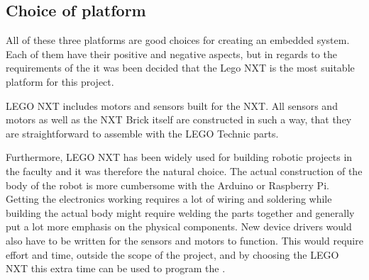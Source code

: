 \subsection{Choice of platform}
All of these three platforms are good choices for creating an embedded system. Each of them have their positive and negative aspects, but in regards to the requirements of the \projname{} it was been decided that the Lego NXT is the most suitable platform for this project.

LEGO NXT includes motors and sensors built for the NXT. All sensors and motors as well as the NXT Brick itself are constructed in such a way, that they are straightforward to assemble with the LEGO Technic parts. 

Furthermore, LEGO NXT has been widely used for building robotic projects in the faculty and it was therefore the natural choice. The actual construction of the body of the robot is more cumbersome with the Arduino or Raspberry Pi. Getting the electronics working requires a lot of wiring and soldering while building the actual body might require welding the parts together and generally put a lot more emphasis on the physical components. New device drivers would also have to be written for the sensors and motors to function. This would require effort and time, outside the scope of the project, and by choosing the LEGO NXT this extra time can be used to program the \projname{}.



